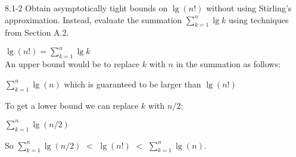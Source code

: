 \begin{problem}{8.1-2}
  Obtain asymptotically tight bounds on $\lg(n!)$ without using Stirling’s approximation. Instead, evaluate the
  summation $\sum\limits_{k=1}^n \lg{k}$ using techniques from Section A.2.
  \begin{solution}
    $\lg(n!) = \sum\limits_{k=1}^n \lg{k}$ \\
    An upper bound would be to replace $k$ with $n$ in the summation as follows:
    \vspace{12pt}

    $\sum\limits_{k=1}^n \lg(n)$ which is guaranteed to be larger than $\lg(n!)$
    \vspace{12pt}

    \noindent To get a lower bound we can replace $k$ with $n/2$:
    \vspace{12pt}

    $\sum\limits_{k=1}^n \lg(n/2)$ \\
    \vspace{12pt}

    \noindent So $\sum\limits_{k=1}^n \lg(n/2)$ $<$ $\lg(n!)$ $<$ $\sum\limits_{k=1}^n \lg(n)$.
  \end{solution}
\end{problem} \newpage

